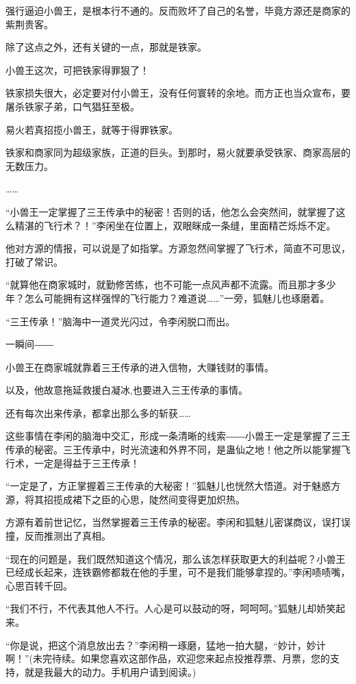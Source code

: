 \begin{this_body}
强行逼迫小兽王，是根本行不通的。反而败坏了自己的名誉，毕竟方源还是商家的紫荆贵客。

除了这点之外，还有关键的一点，那就是铁家。

小兽王这次，可把铁家得罪狠了！

铁家损失很大，必定要对付小兽王，没有任何寰转的余地。而方正也当众宣布，要屠杀铁家子弟，口气猖狂至极。

易火若真招揽小兽王，就等于得罪铁家。

铁家和商家同为超级家族，正道的巨头。到那时，易火就要承受铁家、商家高层的无数压力。

……

“小兽王一定掌握了三王传承中的秘密！否则的话，他怎么会突然间，就掌握了这么精湛的飞行术？！”李闲坐在位置上，双眼眯成一条缝，里面精芒烁烁不定。

他对方源的情报，可以说是了如指掌。方源忽然间掌握了飞行术，简直不可思议，打破了常识。

“就算他在商家城时，就勤修苦练，也不可能一点风声都不流露。而且那才多少年？怎么可能拥有这样强悍的飞行能力？难道说……”一旁，狐魅儿也琢磨着。

“三王传承！”脑海中一道灵光闪过，令李闲脱口而出。

一瞬间――

小兽王在商家城就靠着三王传承的进入信物，大赚钱财的事情。

以及，他故意拖延救援白凝冰,也要进入三王传承的事情。

还有每次出来传承，都拿出那么多的斩获……

这些事情在李闲的脑海中交汇，形成一条清晰的线索――小兽王一定是掌握了三王传承的秘密。三王传承中，时光流速和外界不同，是蛊仙之地！他之所以能掌握飞行术，一定是得益于三王传承！

“一定是了，方正掌握着三王传承的大秘密！”狐魅儿也恍然大悟道。对于魅惑方源，将其招揽成裙下之臣的心思，陡然间变得更加炽热。

方源有着前世记忆，当然掌握着三王传承的秘密。李闲和狐魅儿密谋商议，误打误撞，反而推测出了真相。

“现在的问题是，我们既然知道这个情况，那么该怎样获取更大的利益呢？小兽王已经成长起来，连铁霸修都栽在他的手里，可不是我们能够拿捏的。”李闲啧啧嘴，心思百转千回。

“我们不行，不代表其他人不行。人心是可以鼓动的呀，呵呵呵。”狐魅儿却娇笑起来。

“你是说，把这个消息放出去？”李闲稍一琢磨，猛地一拍大腿，“妙计，妙计啊！”(未完待续。如果您喜欢这部作品，欢迎您来起点投推荐票、月票，您的支持，就是我最大的动力。手机用户请到阅读。)

\end{this_body}

